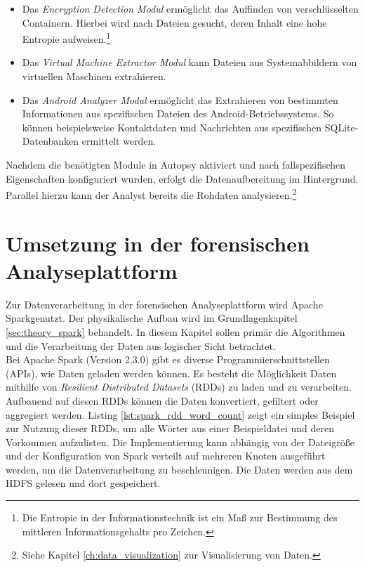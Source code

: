 \begin{itemize}
\item Das \textit{Encryption Detection Modul} ermöglicht das Auffinden von verschlüsselten Containern. Hierbei wird nach Dateien gesucht, deren Inhalt eine hohe Entropie aufweisen.\footnote{Die Entropie in der Informationstechnik ist ein Maß zur Bestimmung des mittleren Informationsgehalts pro Zeichen. 
}
\item Das \textit{Virtual Machine Extractor Modul} kann Dateien aus Systemabbildern von virtuellen Maschinen extrahieren.
\item Das \textit{Android Analyzer Modul} ermöglicht das Extrahieren von bestimmten Informationen aus spezifischen Dateien des Android-Betriebssystems. So können beispielsweise Kontaktdaten und Nachrichten aus spezifischen SQLite-Datenbanken ermittelt werden.
\end{itemize}

\noindent
Nachdem die benötigten Module in Autopsy aktiviert und nach fallspezifischen Eigenschaften konfiguriert wurden, erfolgt die Datenaufbereitung im Hintergrund. Parallel hierzu kann der Analyst bereits die Rohdaten analysieren.\footnote{Siehe Kapitel \ref{ch:data_visualization} zur Visualisierung von Daten.}\\

\section{Umsetzung in der forensischen Analyseplattform}

Zur Datenverarbeitung in der forensischen Analyseplattform wird Apache Spark\texttrademark\thinspace genutzt. Der physikalische Aufbau wird im Grundlagenkapitel \ref{sec:theory_spark} behandelt. In diesem Kapitel sollen primär die Algorithmen und die Verarbeitung der Daten aus logischer Sicht betrachtet.\\ 

\noindent
Bei Apache Spark (Version 2.3.0) gibt es diverse Programmierschnittstellen (APIs), wie Daten geladen werden können. Es besteht die Möglichkeit Daten mithilfe von \textit{Resilient Distributed Datasets} (RDDs) zu laden und zu verarbeiten. Aufbauend auf diesen RDDs können die Daten konvertiert, gefiltert oder aggregiert werden.
Listing \ref{lst:spark_rdd_word_count} zeigt ein simples Beispiel zur Nutzung dieser RDDs, um alle Wörter aus einer Beispieldatei  und deren Vorkommen aufzulisten. Die Implementierung kann abhängig von der Dateigröße und der Konfiguration von Spark verteilt auf mehreren Knoten ausgeführt werden, um die Datenverarbeitung zu beschleunigen. Die Daten werden aus dem HDFS gelesen und dort gespeichert.

